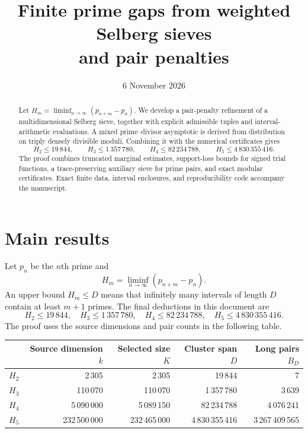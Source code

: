\documentclass[11pt,a4paper]{article}
\theoremstyle{definition}\newtheorem{definition}[theorem]{Definition}
\theoremstyle{remark}\newtheorem{remark}[theorem]{Remark}
\newcommand{\smalltable}{\small\setlength{\tabcolsep}{5pt}}
\numberwithin{equation}{section}
\begin{document}
\title{Finite prime gaps from weighted Selberg sieves\\and pair penalties}
\author{\vspace{-1.2em}}
\date{6 November 2026}
\maketitle
\begin{abstract}
Let $H_m=\liminf_{n\to\infty}(p_{n+m}-p_n)$. We develop a pair-penalty refinement of a multidimensional Selberg sieve, together with explicit admissible tuples and interval-arithmetic evaluations. A mixed prime--divisor asymptotic is derived from distribution on triply densely divisible moduli. Combining it with the numerical certificates gives
\[
H_2\le19\,844,\qquad H_3\le1\,357\,780,\qquad
H_4\le82\,234\,788,\qquad H_5\le4\,830\,355\,416.
\]
The proof combines truncated marginal estimates, support-loss bounds for signed trial functions, a trace-preserving auxiliary sieve for prime pairs, and exact modular certificates. Exact finite data, interval enclosures, and reproducibility code accompany the manuscript.
\end{abstract}
\begingroup\setlength{\parskip}{0pt}\small\tableofcontents\endgroup
\clearpage

\section{Main results}\label{sec:results}
Let $p_n$ be the $n$th prime and
\[
 H_m=\liminf_{n\to\infty}(p_{n+m}-p_n).
\]
An upper bound $H_m\le D$ means that infinitely many intervals of length $D$ contain at least $m+1$ primes. The final deductions in this document are
\begin{equation}\label{eq:main}
 \boxed{H_2\le19\,844,\quad H_3\le1\,357\,780,\quad
 H_4\le82\,234\,788,\quad H_5\le4\,830\,355\,416.}
\end{equation}
The proof uses the source dimensions and pair counts in the following table.

\begin{center}\smalltable
\begin{tabular}{@{}lrrrr@{}}\toprule
 & Source dimension $k$ & Selected size $K$ & Cluster span $D$ & Long pairs $B_D$\\\midrule
$H_2$ & 2\,305 & 2\,305 & 19\,844 & 7\\
$H_3$ & 110\,070 & 110\,070 & 1\,357\,780 & 3\,639\\
$H_4$ & 5\,090\,000 & 5\,089\,150 & 82\,234\,788 & 4\,076\,241\\
$H_5$ & 232\,500\,000 & 232\,465\,000 & 4\,830\,355\,416 & 3\,267\,409\,565\\\bottomrule
\end{tabular}\end{center}
\end{document}
